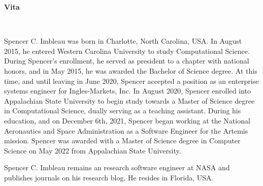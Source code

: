 \vspace*{0.5in}
\begin{center}
    \textbf{Vita}\\[2ex]
\end{center}

\begin{doublespace}
Spencer C. Imbleau was born in Charlotte, North Carolina, USA. In August 2015, he entered Western Carolina University to study Computational Science. During Spencer's enrollment, he served as president to a chapter with national honors, and in May 2015, he was awarded the Bachelor of Science degree. At this time, and until leaving in June 2020, Spencer accepted a position as an enterprise systems engineer for Ingles-Markets, Inc. In August 2020, Spencer enrolled into Appalachian State University to begin study towards a Master of Science degree in Computational Science, dually serving as a teaching assistant. During his education, and on December 6th, 2021, Spencer began working at the National Aeronautics and Space Administration as a Software Engineer for the Artemis mission. Spencer was awarded with a Master of Science degree in Computer Science on May 2022 from Appalachian State University.

Spencer C. Imbleau remains an research software engineer at NASA and publishes journals on his research blog. He resides in Florida, USA.
\end{doublespace}